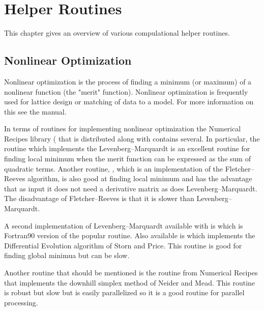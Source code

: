 \chapter{Helper Routines}
\label{c:helper}

This chapter gives an overview of various compulational helper routines.

\section{Nonlinear Optimization}
\label{s:opti}

Nonlinear optimization is the process of finding a minimum (or
maximum) of a nonlinear function (the "merit" function). Nonlinear
optimization is frequently used for lattice design or matching of data
to a model. For more information on this see the \tao manual.

In terms of routines for implementing nonlinear optimization the
Numerical Recipes library ( that is distributed along
with \bmad contains several. In particular, the routine 
which implements the Levenberg--Marquardt is an excellent routine for
finding local minimum when the merit function can be expressed as the
sum of quadratic terms. Another routine, , which is an
implementation of the Fletcher--Reeves algorithm, is also good at
finding local minimum and has the advantage that as input it does not
need a derivative matrix as does Levenberg--Marquardt. The
disadvantage of Fletcher--Reeves is that it is slower than
Levenberg--Marquardt. 

A second implementation of Levenberg--Marquardt available with \bmad
is  which is Fortran90 version of the popular
 routine. Also available is  which implements
the Differential Evolution algorithm of Storn and
Price\cite{b:storn}. This routine is good for finding global minimua
but can be slow. 

Another routine that should be mentioned is the  routine
from Numerical Recipes that implements the downhill simplex method of
Neider and Mead. This routine is robust but slow but is easily
parallelized so it is a good routine for parallel processing.
